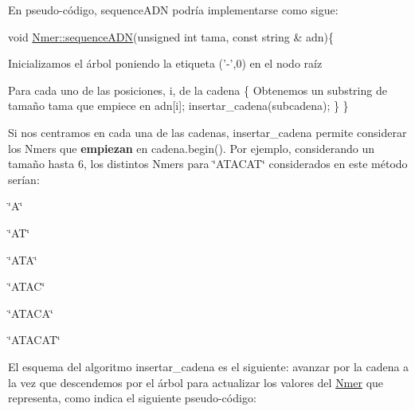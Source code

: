 En pseudo-\/código, sequence\+A\+DN podría implementarse como sigue\+:


\begin{DoxyCode}
\textcolor{keywordtype}{void} \hyperlink{classNmer_ae8871242f0e282d71e4c9b4685f468be}{Nmer::sequenceADN}(\textcolor{keywordtype}{unsigned} \textcolor{keywordtype}{int} tama, \textcolor{keyword}{const} \textcolor{keywordtype}{string} & adn)\{

  Inicializamos el árbol poniendo la  etiqueta (\textcolor{charliteral}{'-'},0) en el nodo raíz 

  Para cada uno de las posiciones, i,  de la cadena \{
    Obtenemos un substring de tamaño tama que empiece en adn[i];
    insertar\_cadena(subcadena);
  \}
\}
\end{DoxyCode}


Si nos centramos en cada una de las cadenas, insertar\+\_\+cadena permite considerar los Nmers que {\bfseries empiezan} en cadena.\+begin(). Por ejemplo, considerando un tamaño hasta 6, los distintos Nmers para \char`\"{}\+A\+T\+A\+C\+A\+T\char`\"{} considerados en este método serían\+:


\begin{DoxyEnumerate}
\item \char`\"{}\+A\char`\"{}
\item \char`\"{}\+A\+T\char`\"{}
\item \char`\"{}\+A\+T\+A\char`\"{}
\item \char`\"{}\+A\+T\+A\+C\char`\"{}
\item \char`\"{}\+A\+T\+A\+C\+A\char`\"{}
\item \char`\"{}\+A\+T\+A\+C\+A\+T\char`\"{}
\end{DoxyEnumerate}

El esquema del algoritmo insertar\+\_\+cadena es el siguiente\+: avanzar por la cadena a la vez que descendemos por el árbol para actualizar los valores del \hyperlink{classNmer}{Nmer} que representa, como indica el siguiente pseudo-\/código\+:



